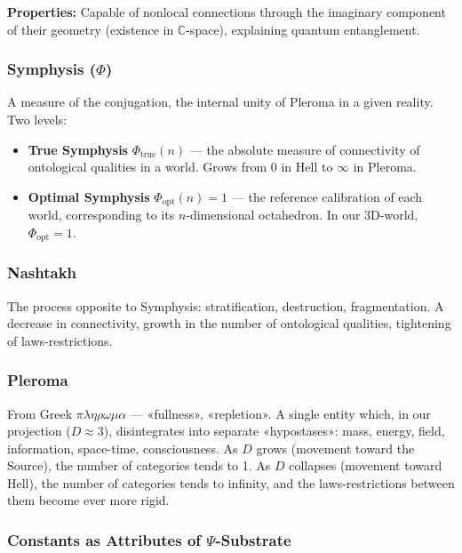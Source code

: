 \documentclass[a4paper,12pt]{article}
\begin{document}
	\textbf{Properties:} Capable of nonlocal connections through the imaginary component of their geometry (existence in $\mathbb{C}$-space), explaining quantum entanglement.
	
	\subsubsection{Symphysis ($\Phi$)}
	
	A measure of the conjugation, the internal unity of Pleroma in a given reality. Two levels:
	\begin{itemize}
		\item \textbf{True Symphysis} $\Phi_{\text{true}}(n)$ — the absolute measure of connectivity of ontological qualities in a world. Grows from 0 in Hell to $\infty$ in Pleroma.
		\item \textbf{Optimal Symphysis} $\Phi_{\text{opt}}(n) = 1$ — the reference calibration of each world, corresponding to its $n$-dimensional octahedron. In our 3D-world, $\Phi_{\text{opt}} = 1$.
	\end{itemize}
	
	\subsubsection{Nashtakh}
	
	The process opposite to Symphysis: stratification, destruction, fragmentation. A decrease in connectivity, growth in the number of ontological qualities, tightening of laws-restrictions.
	
	\subsubsection{Pleroma}
	
	From Greek $\pi\lambda\eta\rho\omega\mu\alpha$ — «fullness», «repletion». A single entity which, in our projection ($D \approx 3$), disintegrates into separate «hypostases»: mass, energy, field, information, space-time, consciousness. As $D$ grows (movement toward the Source), the number of categories tends to 1. As $D$ collapses (movement toward Hell), the number of categories tends to infinity, and the laws-restrictions between them become ever more rigid.
	
	\subsubsection{Constants as Attributes of $\Psi$-Substrate}
	
\end{document}
